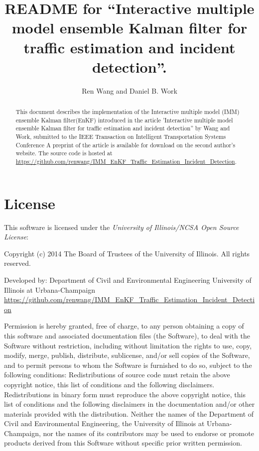 \documentclass[english]{article}
\begin{document}
\title{README for ``Interactive multiple model ensemble Kalman filter for traffic estimation and incident detection''. }


\author{Ren Wang and Daniel B. Work}
\maketitle
\begin{abstract}
This document describes the implementation of the Interactive multiple model (IMM) ensemble Kalman filter(EnKF) introduced in the article
'Interactive multiple model ensemble Kalman filter for traffic estimation and incident detection'' by Wang and Work,
submitted to the IEEE Transaction on Intelligent Transportation Systems Conference
A preprint of the article is available for download on the second
author's website. The source code is hosted at \url{https://github.com/renwang/IMM_EnKF_Traffic_Estimation_Incident_Detection}.
\end{abstract}

\section{License}

This software is licensed under the \emph{University of Illinois/NCSA
Open Source License}:

\begin{center}
Copyright (c) 2014 The Board of Trustees of the University of Illinois.
All rights reserved.
\par\end{center}

\begin{center}
Developed by: Department of Civil and Environmental Engineering University
of Illinois at Urbana-Champaign \url{https://github.com/renwang/IMM_EnKF_Traffic_Estimation_Incident_Detection}
\par\end{center}

Permission is hereby granted, free of charge, to any person obtaining
a copy of this software and associated documentation files (the \textquotedbl{}Software\textquotedbl{}),
to deal with the Software without restriction, including without limitation
the rights to use, copy, modify, merge, publish, distribute, sublicense,
and/or sell copies of the Software, and to permit persons to whom
the Software is furnished to do so, subject to the following conditions:
Redistributions of source code must retain the above copyright notice,
this list of conditions and the following disclaimers. Redistributions
in binary form must reproduce the above copyright notice, this list
of conditions and the following disclaimers in the documentation and/or
other materials provided with the distribution. Neither the names
of the Department of Civil and Environmental Engineering, the University
of Illinois at Urbana-Champaign, nor the names of its contributors
may be used to endorse or promote products derived from this Software
without specific prior written permission.
\end{document}

